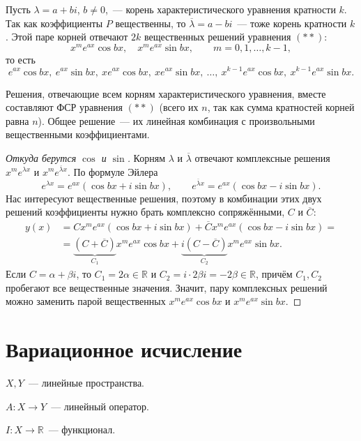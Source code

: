 \documentclass[12pt]{article}
\begin{document}
	\begin{theorem}
		Пусть $\lambda = a + bi$, $b \ne 0$,~--- корень характеристического уравнения кратности $k$. Так как коэффициенты $P$ вещественны, то $\overline{\lambda} = a - bi$~--- тоже корень кратности $k$. Этой паре корней отвечают $2k$ вещественных решений уравнения $(**)$:
		\[
			x^m e^{ax} \cos bx, \quad x^m e^{ax} \sin bx, \qquad m = 0, 1, \dots, k - 1,
		\]
		то есть
		\[
			e^{ax} \cos bx, \ e^{ax} \sin bx, \ x e^{ax} \cos bx, \ x e^{ax} \sin bx, \ \dots, \ x^{k-1} e^{ax} \cos bx, \ x^{k-1} e^{ax} \sin bx.
		\]
	\end{theorem}

	\begin{statement}
		Решения, отвечающие всем корням характеристического уравнения, вместе составляют ФСР уравнения $(**)$ (всего их $n$, так как сумма кратностей корней равна $n$). Общее решение~--- их линейная комбинация с произвольными вещественными коэффициентами.
	\end{statement}

	\begin{proof}[Откуда берутся $\cos$ и $\sin$]
		Корням $\lambda$ и $\overline{\lambda}$ отвечают комплексные решения $x^m e^{\lambda x}$ и $x^m e^{\overline{\lambda} x}$. По формуле Эйлера
		\[
			e^{\lambda x} = e^{ax} (\cos bx + i \sin bx), \qquad e^{\overline{\lambda} x} = e^{ax} (\cos bx - i \sin bx).
		\]
		Нас интересуют вещественные решения, поэтому в комбинации этих двух решений коэффициенты нужно брать комплексно сопряжёнными, $C$ и $\overline{C}$:
		\[
			\begin{aligned}
				y(x) &= C x^m e^{ax} (\cos bx + i \sin bx) + \overline{C} x^m e^{ax} (\cos bx - i \sin bx) = \\
				&= \underbrace{(C + \overline{C})}_{C_1} x^m e^{ax} \cos bx + \underbrace{i (C - \overline{C})}_{C_2} x^m e^{ax} \sin bx.
			\end{aligned}
		\]
		Если $C = \alpha + \beta i$, то $C_1 = 2\alpha \in \mathbb{R}$ и $C_2 = i \cdot 2\beta i = -2\beta \in \mathbb{R}$, причём $C_1, C_2$ пробегают все вещественные значения. Значит, пару комплексных решений можно заменить парой вещественных $x^m e^{ax} \cos bx$ и $x^m e^{ax} \sin bx$.
	\end{proof}

	\section{Вариационное исчисление}

	\begin{definition}
		$X, Y$~--- линейные пространства.

		$A: X \rightarrow Y$~--- линейный оператор.

		$I: X \rightarrow \mathbb{R}$~--- функционал.
	\end{definition}
	
\end{document}
